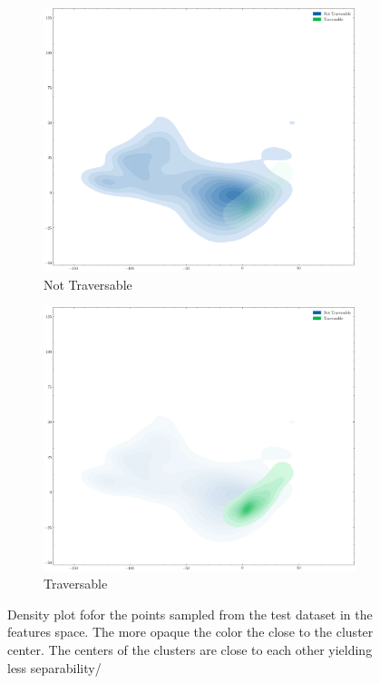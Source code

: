 \documentclass[../document.tex]{subfiles}
\begin{document}
\begin{figure} [htbp]
\begin{subfigure}[b]{0.48\textwidth}
    \includegraphics[width=\linewidth]{../img/5/pca/pca-test-0-density.png}
    \caption{Not Traversable}
\end{subfigure}
\begin{subfigure}[b]{0.48\textwidth}
    \includegraphics[width=\linewidth]{../img/5/pca/pca-test-1-density.png}
    \caption{Traversable}
    \label{fig : pca-test-density-1}
\end{subfigure}
\caption{Density plot fofor the points sampled from the test dataset in the features space.  The more opaque the color the close to the cluster center. The centers of the clusters are close to each other yielding less separability/}
\end{figure}
\end{document}
